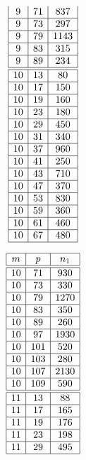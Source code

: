 \documentclass[a4paper, 10pt]{article}
\begin{document}
\begin{center}
\begin{minipage}[t]{.23\textwidth}
\begin{displaymath}
\begin{array}{|c|c|c|}
9 & 71 & 837 \\ \hline
9 & 73 & 297 \\ \hline
9 & 79 & 1143 \\ \hline
9 & 83 & 315 \\ \hline
9 & 89 & 234 \\ \hline
\hline
10 & 13 & 80 \\ \hline
10 & 17 & 150 \\ \hline
10 & 19 & 160 \\ \hline
10 & 23 & 180 \\ \hline
10 & 29 & 450 \\ \hline
10 & 31 & 340 \\ \hline
10 & 37 & 960 \\ \hline
10 & 41 & 250 \\ \hline
10 & 43 & 710 \\ \hline
10 & 47 & 370 \\ \hline
10 & 53 & 830 \\ \hline
10 & 59 & 360 \\ \hline
10 & 61 & 460 \\ \hline
10 & 67 & 480 \\ \hline
\end{array}
\end{displaymath}
\end{minipage}
\begin{minipage}[t]{.23\textwidth}
\begin{displaymath}
\begin{array}{|c|c|c|}
\hline
m & p & n_{1} \\ \hline
\hline
10 & 71 & 930 \\ \hline
10 & 73 & 330 \\ \hline
10 & 79 & 1270 \\ \hline
10 & 83 & 350 \\ \hline
10 & 89 & 260 \\ \hline
10 & 97 & 1930 \\ \hline
10 & 101 & 520 \\ \hline
10 & 103 & 280 \\ \hline
10 & 107 & 2130 \\ \hline
10 & 109 & 590 \\ \hline
\hline
11 & 13 & 88 \\ \hline
11 & 17 & 165 \\ \hline
11 & 19 & 176 \\ \hline
11 & 23 & 198 \\ \hline
11 & 29 & 495 \\ \hline

\end{array}
\end{displaymath}
\end{minipage}
\end{center}
\end{document}
